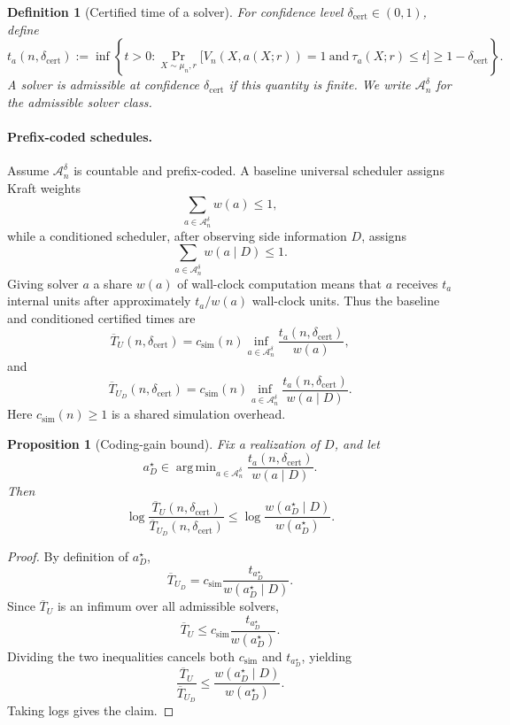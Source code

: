 \documentclass{article}
\newtheorem{definition}{Definition}
\newtheorem{proposition}{Proposition}
\DeclareMathOperator*{\argmin}{arg\,min}
\newcommand{\cA}{\mathcal{A}}
\begin{document}
\begin{definition}[Certified time of a solver]
\label{def:app-certified-time}
For confidence level \(\delta_{\mathrm{cert}}\in(0,1)\), define
\[
    t_a(n,\delta_{\mathrm{cert}})
    :=
    \inf\left\{
        t>0:
        \Pr_{X\sim\mu_n,r}
        \big[
            V_n(X,a(X;r))=1
            \ \mathrm{and}\
            \tau_a(X;r)\le t
        \big]
        \ge 1-\delta_{\mathrm{cert}}
    \right\}.
\]
A solver is admissible at confidence \(\delta_{\mathrm{cert}}\) if this quantity is finite.
We write \(\cA_n^\delta\) for the admissible solver class.
\end{definition}

\paragraph{Prefix-coded schedules.}
Assume \(\cA_n^\delta\) is countable and prefix-coded.
A baseline universal scheduler assigns Kraft weights
\[
    \sum_{a\in\cA_n^\delta} w(a)\le 1,
\]
while a conditioned scheduler, after observing side information \(D\), assigns
\[
    \sum_{a\in\cA_n^\delta} w(a\mid D)\le 1.
\]
Giving solver \(a\) a share \(w(a)\) of wall-clock computation means that \(a\) receives
\(t_a\) internal units after approximately \(t_a/w(a)\) wall-clock units.  Thus the baseline
and conditioned certified times are
\[
    \overline T_U(n,\delta_{\mathrm{cert}})
    =
    c_{\mathrm{sim}}(n)
    \inf_{a\in\cA_n^\delta}
    \frac{t_a(n,\delta_{\mathrm{cert}})}{w(a)},
\]
and
\[
    \overline T_{U_D}(n,\delta_{\mathrm{cert}})
    =
    c_{\mathrm{sim}}(n)
    \inf_{a\in\cA_n^\delta}
    \frac{t_a(n,\delta_{\mathrm{cert}})}{w(a\mid D)}.
\]
Here \(c_{\mathrm{sim}}(n)\ge 1\) is a shared simulation overhead.

\begin{proposition}[Coding-gain bound]
\label{prop:app-coding-gain}
Fix a realization of \(D\), and let
\[
    a_D^\star
    \in
    \argmin_{a\in\cA_n^\delta}
    \frac{t_a(n,\delta_{\mathrm{cert}})}{w(a\mid D)}.
\]
Then
\[
    \log\frac{\overline T_U(n,\delta_{\mathrm{cert}})}
             {\overline T_{U_D}(n,\delta_{\mathrm{cert}})}
    \le
    \log\frac{w(a_D^\star\mid D)}{w(a_D^\star)}.
\]
\end{proposition}

\begin{proof}
By definition of \(a_D^\star\),
\[
    \overline T_{U_D}
    =
    c_{\mathrm{sim}}
    \frac{t_{a_D^\star}}{w(a_D^\star\mid D)}.
\]
Since \(\overline T_U\) is an infimum over all admissible solvers,
\[
    \overline T_U
    \le
    c_{\mathrm{sim}}
    \frac{t_{a_D^\star}}{w(a_D^\star)}.
\]
Dividing the two inequalities cancels both \(c_{\mathrm{sim}}\) and \(t_{a_D^\star}\), yielding
\[
    \frac{\overline T_U}{\overline T_{U_D}}
    \le
    \frac{w(a_D^\star\mid D)}{w(a_D^\star)}.
\]
Taking logs gives the claim.
\end{proof}
\end{document}
